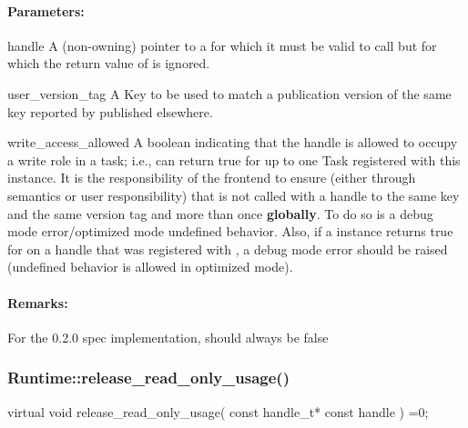 \paragraph{Parameters:}
\begin{compactdesc} 
\item[handle] A (non-owning) pointer to a  for which it must be valid to call 
     but for which the return value of  is ignored.
     
\item[user\_version\_tag] A Key to be used to match a publication version of the same key reported
       by  published elsewhere.
     
\item[write\_access\_allowed] A boolean indicating that the handle is allowed to occupy a write role in
       a task; i.e.,  can return true for up to one Task  registered with this instance.
       It is the responsibility of the frontend to ensure (either through semantics or user responsibility) that
        is not called with a handle to the same key and the same version tag and
        more than once {\bf globally}.  To do so is a debug mode error/optimized mode
       undefined behavior.  Also, if a  instance returns true for 
       on a handle that was registered with , a debug mode error should be raised
       (undefined behavior is allowed in optimized mode).
\end{compactdesc}
     
\paragraph{Remarks:} For the 0.2.0 spec implementation,  should always be false


\subsubsection{Runtime::release\_read\_only\_usage()}
\begin{CppCode}
    virtual void
    release_read_only_usage(
      const handle_t* const handle
    ) =0;
\end{CppCode}

